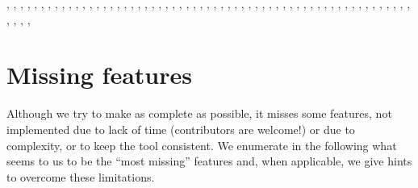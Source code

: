 ,
,
,
,
,
,
,
,
,
,
,
,
,
,
,
,
,
,
,
,
,
,
,
,
,
,
,
,
,
,
,
,
,
,
,
,
,
,
,
,
,
,
,
,
,
,
,
,
,
,
,
,
,
,
,
,
,
,
,
,
,
,
,






\chapter{Missing features}

Although we try to make \imitator{} as complete as possible, it misses some features, not implemented due to lack of time (contributors are welcome!) or due to complexity, or to keep the tool consistent.
We enumerate in the following what seems to us to be the ``most missing'' features and, when applicable, we give hints to overcome these limitations.


%

